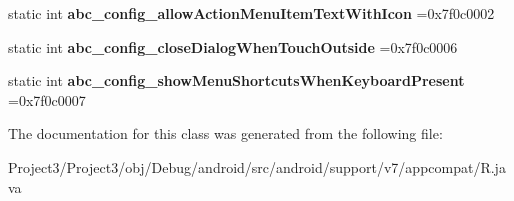 \begin{DoxyCompactItemize}
static int {\bfseries abc\+\_\+config\+\_\+allow\+Action\+Menu\+Item\+Text\+With\+Icon} =0x7f0c0002
\item 
\mbox{\label{classandroid_1_1support_1_1v7_1_1appcompat_1_1R_1_1bool_a6e160aa20e0d7c9d6821d8a23766b596}} 
static int {\bfseries abc\+\_\+config\+\_\+close\+Dialog\+When\+Touch\+Outside} =0x7f0c0006
\item 
\mbox{\label{classandroid_1_1support_1_1v7_1_1appcompat_1_1R_1_1bool_aa158570abd74c30eb17fe6eebc87179d}} 
static int {\bfseries abc\+\_\+config\+\_\+show\+Menu\+Shortcuts\+When\+Keyboard\+Present} =0x7f0c0007
\end{DoxyCompactItemize}


The documentation for this class was generated from the following file\+:\begin{DoxyCompactItemize}
\item 
Project3/\+Project3/obj/\+Debug/android/src/android/support/v7/appcompat/R.\+java\end{DoxyCompactItemize}
